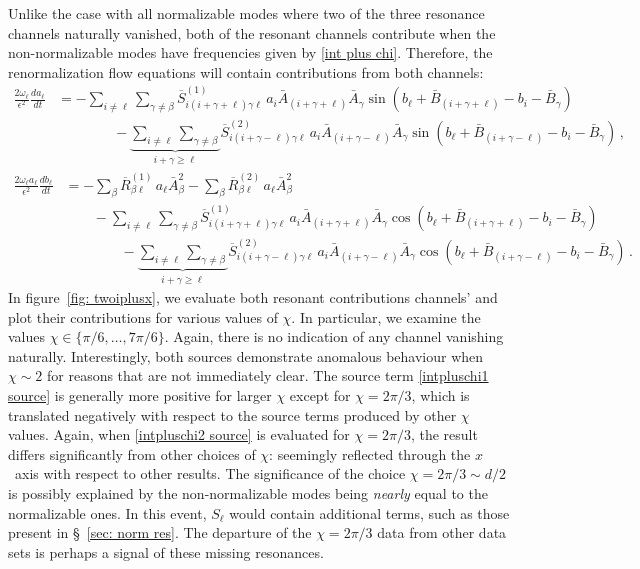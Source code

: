 \documentclass[letterpaper,11pt]{article}
\newcommand{\ol}{\omega_\ell}
\begin{document}
Unlike the case with all normalizable modes where two of the three resonance channels naturally vanished, both of the resonant channels contribute when the non-normalizable modes have frequencies given by \eqref{int plus chi}. Therefore, the renormalization flow equations will contain contributions from both channels:
\begin{align}
\frac{2 \ol}{\epsilon^2} \frac{d a_\ell}{d t} &= - \sum_{i \neq \ell} \sum_{\gamma \neq \beta} \overline{S}^{(1)}_{i (i + \gamma + \ell) \gamma \ell} \, a_i \bar A_{(i + \gamma + \ell)} \bar A_\gamma \sin \left( b_\ell + \bar B_{(i + \gamma + \ell)} - b_i - \bar B_\gamma \right) \nonumber \\
%
& \qquad \qquad -  \underbrace{\sum_{i \neq \ell} \sum_{\gamma \neq \beta}}_{i + \gamma \geq \ell} \overline{S}^{(2)}_{i (i + \gamma - \ell) \gamma \ell} \, a_i \bar A_{(i + \gamma - \ell)} \bar A_\gamma \sin \left( b_\ell + \bar B_{(i+\gamma - \ell)} - b_i - \bar B_\gamma \right) \, ,
\end{align}
\begin{align}
\frac{2 \ol a_\ell}{\epsilon^2} \frac{d b_\ell}{dt} &=  - \sum_\beta \overline{R}^{(1)}_{\beta \ell} \, a_\ell \bar A_\beta^2 - \sum_\beta \overline{R}^{(2)}_{\beta\ell} \, a_\ell \bar A_\beta^2 \nonumber \\
%
& \qquad - \sum_{i \neq \ell} \sum_{\gamma \neq \beta} \overline{S}^{(1)}_{i (i + \gamma + \ell) \gamma \ell} \, a_i \bar A_{(i + \gamma + \ell)} \bar A_\gamma \cos \left( b_\ell + \bar B_{(i + \gamma + \ell)} - b_i - \bar B_\gamma \right) \nonumber \\
%
& \qquad \qquad -  \underbrace{\sum_{i \neq \ell} \sum_{\gamma \neq \beta}}_{i + \gamma \geq \ell} \overline{S}^{(2)}_{i (i + \gamma - \ell) \gamma \ell} \, a_i \bar A_{(i + \gamma - \ell)} \bar A_\gamma \cos \left( b_\ell + \bar B_{(i+\gamma - \ell)} - b_i - \bar B_\gamma \right) \, .
\end{align}
In figure~\ref{fig: twoiplusx}, we evaluate both resonant contributions channels' and plot their contributions for various values of $\chi$. In particular, we examine the values $\chi \in \{ \pi/6, \ldots, 7\pi/6 \}$. Again, there is no indication of any channel vanishing naturally. Interestingly, both sources demonstrate anomalous behaviour when $\chi \sim 2$ for reasons that are not immediately clear. The source term \eqref{intpluschi1 source} is generally more positive for larger $\chi$ except for $\chi = 2 \pi / 3$, which is translated negatively with respect to the source terms produced by other $\chi$ values. Again, when \eqref{intpluschi2 source} is evaluated for $\chi = 2 \pi/3$, the result differs significantly from other choices of $\chi$: seemingly reflected through the $x$~axis with respect to other results. The significance of the choice $\chi = 2\pi / 3 \sim d / 2$ is possibly explained by the non-normalizable modes being \emph{nearly} equal to the normalizable ones. In this event, $S_\ell$ would contain additional terms, such as those present in \S~\!\ref{sec: norm res}. The departure of the $\chi = 2\pi/3$ data from other data sets is perhaps a signal of these missing resonances.
\end{document}
